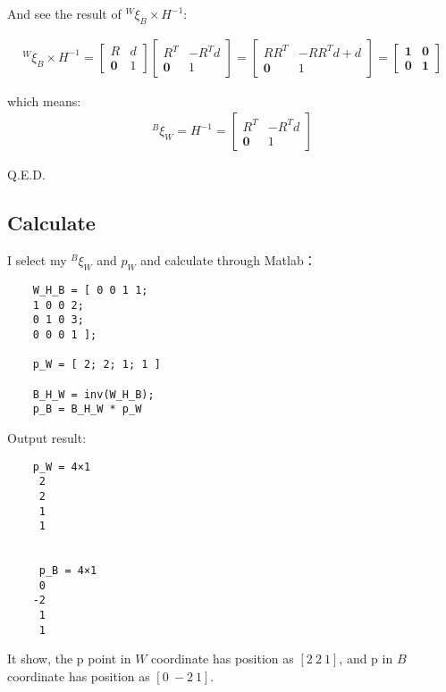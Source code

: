 And see the result of $ ^W\xi_B \times H^{-1} $:

\begin{equation}
    \begin{aligned}
        ^W\xi_B \times H^{-1} = \begin{bmatrix} R & d \\ \boldsymbol{0} & 1 \end{bmatrix} \begin{bmatrix} R^T & -R^Td \\ \boldsymbol{0} & 1 \end{bmatrix} = \begin{bmatrix} RR^T & -RR^Td+d\\\boldsymbol{0} & 1 \end{bmatrix}=\boldsymbol{\begin{bmatrix} 1 &0\\0&1 \end{bmatrix}}
    \end{aligned}
\end{equation}

which means:
\begin{equation}
    \begin{aligned}
        ^B{\xi}_{W} = H^{-1} = \begin{bmatrix}
            R^T & -R^T d \\
            \mathbf{0} & 1
            \end{bmatrix}
    \end{aligned}
\end{equation}

Q.E.D.

\subsection{Calculate}

I select my $ ^B{\xi}_{W} $ and $ p_W $ and calculate through Matlab：
\begin{lstlisting}
    W_H_B = [ 0 0 1 1;
    1 0 0 2;
    0 1 0 3;
    0 0 0 1 ];

    p_W = [ 2; 2; 1; 1 ]

    B_H_W = inv(W_H_B);
    p_B = B_H_W * p_W

\end{lstlisting}

Output result:

\begin{lstlisting}
    p_W = 4×1    
     2
     2
     1
     1


     p_B = 4×1    
     0
    -2
     1
     1

\end{lstlisting}

It show, the p point in $W$ coordinate has position as $[2\  2\  1]$, and p in $B$ coordinate has position as $[0\  -2\  1]$.

